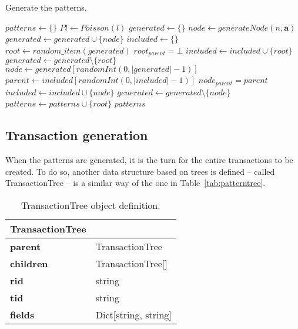 \documentclass{acm_proc_article-sp-sigmod09}
\begin{document}
\begin{algorithm}
\caption{Generate the patterns.}
\label{generate_patterns}
\begin{algorithmic}[1]
\State $patterns \gets \{\}$
	\State $Pl \gets Poisson(l)$
	\State $generated \gets \{\}$
		\State $node \gets generateNode(n, \boldsymbol{a}) $ 
		\State $generated \gets generated \cup \{node\}$
	\EndFor
	\State $included \gets \{\}$
	\State $root \gets random\_item(generated)$
	\State $root_{parent} = \bot$
	\State $included \gets included \cup \{root\}$
	\State $generated \gets generated \setminus \{root\}$
		\State $node \gets generated[randomInt(0, |generated| - 1)]$
		\State $parent \gets included[randomInt(0, |included| - 1)]$
		\State $node_{parent} = parent$
		\State $included \gets included \cup \{node\}$
		\State $generated \gets generated \setminus \{node\}$
	\EndFor
	\State $patterns \gets patterns \cup \{root\}$
\EndFor
\Return $patterns$
\EndFunction
\end{algorithmic}
\end{algorithm}

\subsection{Transaction generation}
When the patterns are generated, it is the turn for the entire transactions to be created. To do so, another data structure based on trees is defined -- called TransactionTree -- is a similar way of the one in Table~\ref{tab:patterntree}.

\begin{table}[H]
\centering
\begin{tabular}{|ll|} \hline
\textbf{TransactionTree} & \\ \hline
\textbf{parent} & TransactionTree \\ \hline
\textbf{children} & TransactionTree[] \\ \hline
\textbf{rid} & string \\ \hline
\textbf{tid} & string \\ \hline
\textbf{fields} & Dict[string, string] \\
\hline\end{tabular}
\caption{TransactionTree object definition.}
\label{tab:transactiontree}
\end{table}
\end{document}
